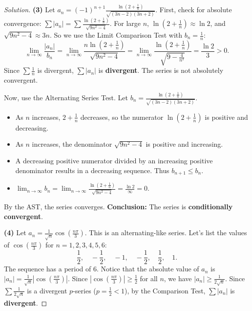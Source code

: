 \documentclass[11pt]{article}
\theoremstyle{definition}
\newenvironment{solution}{\begin{proof}[Solution]}{\end{proof}}
\begin{document}
\begin{solution}
\textbf{(3)} Let $a_n = (-1)^{n+1}\frac{\ln(2+\frac{1}{n})}{\sqrt{(3n-2)(3n+2)}}$.
First, check for absolute convergence: $\sum |a_n| = \sum \frac{\ln(2+\frac{1}{n})}{\sqrt{9n^2-4}}$.
For large $n$, $\ln(2+\frac{1}{n}) \approx \ln 2$, and $\sqrt{9n^2-4} \approx 3n$. So we use the Limit Comparison Test with $b_n = \frac{1}{n}$:
\[
\lim_{n \to \infty} \frac{|a_n|}{b_n} = \lim_{n \to \infty} \frac{n\ln(2+\frac{1}{n})}{\sqrt{9n^2-4}} = \lim_{n \to \infty} \frac{\ln(2+\frac{1}{n})}{\sqrt{9-\frac{4}{n^2}}} = \frac{\ln 2}{3} > 0.
\]
Since $\sum \frac{1}{n}$ is divergent, $\sum |a_n|$ is \textbf{divergent}. The series is not absolutely convergent.

Now, use the Alternating Series Test. Let $b_n = \frac{\ln(2+\frac{1}{n})}{\sqrt{(3n-2)(3n+2)}}$.
\begin{itemize}
    \item As $n$ increases, $2+\frac{1}{n}$ decreases, so the numerator $\ln(2+\frac{1}{n})$ is positive and decreasing.
    \item As $n$ increases, the denominator $\sqrt{9n^2-4}$ is positive and increasing.
    \item A decreasing positive numerator divided by an increasing positive denominator results in a decreasing sequence. Thus $b_{n+1} \le b_n$.
    \item $\lim_{n \to \infty} b_n = \lim_{n \to \infty} \frac{\ln(2+\frac{1}{n})}{\sqrt{9n^2-4}} = \frac{\ln 2}{\infty} = 0$.
\end{itemize}
By the AST, the series converges.
\textbf{Conclusion:} The series is \textbf{conditionally convergent}.

\textbf{(4)} Let $a_n = \frac{1}{\sqrt{n}}\cos\left(\frac{n\pi}{3}\right)$.
This is an alternating-like series. Let's list the values of $\cos\left(\frac{n\pi}{3}\right)$ for $n = 1, 2, 3, 4, 5, 6$:
\[
\frac{1}{2}, \quad -\frac{1}{2}, \quad -1, \quad -\frac{1}{2}, \quad \frac{1}{2}, \quad 1.
\]
The sequence has a period of 6. Notice that the absolute value of $a_n$ is $|a_n| = \frac{1}{\sqrt{n}}\left|\cos\left(\frac{n\pi}{3}\right)\right|$. Since $\left|\cos\left(\frac{n\pi}{3}\right)\right| \ge \frac{1}{2}$ for all $n$, we have $|a_n| \ge \frac{1}{2\sqrt{n}}$.
Since $\sum \frac{1}{2\sqrt{n}}$ is a divergent $p$-series ($p = \frac{1}{2} < 1$), by the Comparison Test, $\sum |a_n|$ is \textbf{divergent}.


\end{solution}
\end{document}
